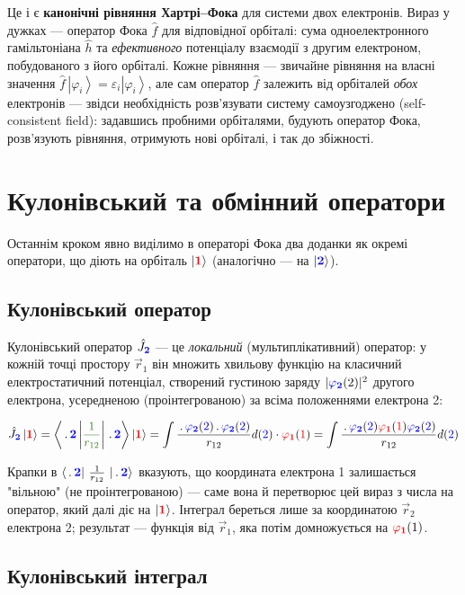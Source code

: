 \documentclass[]{article}
\def\ket#1{\left| #1 \right\rangle }
\def\bra#1{\left\langle #1 \right| }
\def\opbracket#1#2#3{\left\langle #1\left| \textcolor{OliveGreen}{#2}\right|  #3 \right\rangle}
\def\vr{\vec{r}}
\let\vphi\varphi
\let\ve\varepsilon
\def\f{(\textcolor{red}{1})}
\def\s{(\textcolor{blue}{2})}
\def\F{\textcolor{red}{\mathbf{1}}}
\def\S{\textcolor{blue}{\mathbf{2}}}
\def\oa{\textcolor{red}{ \vphi_{\mathbf{1}}} }
\def\ob{\textcolor{blue}{ \vphi_{\mathbf{2}}} }
\def\h{\hat{h}}
\def\V{\frac{1}{r_{12}}}
\def\dt{\,.\,}
\begin{document}
Це і є \textbf{канонічні рівняння Хартрі--Фока} для системи двох електронів. Вираз у дужках --- оператор Фока $\hat f$ для відповідної орбіталі: сума одноелектронного гамільтоніана $\h$ та \emph{ефективного} потенціалу взаємодії з другим електроном, побудованого з його орбіталі. Кожне рівняння --- звичайне рівняння на власні значення $\hat f\,\ket{\vphi_i}=\ve_i\ket{\vphi_i}$, але сам оператор $\hat f$ залежить від орбіталей \emph{обох} електронів --- звідси необхідність розв'язувати систему самоузгоджено (self-consistent field): задавшись пробними орбіталями, будують оператор Фока, розв'язують рівняння, отримують нові орбіталі, і так до збіжності.

\section{Кулонівський та обмінний оператори}

Останнім кроком явно виділимо в операторі Фока два доданки як окремі оператори, що діють на орбіталь $\ket{\F}$ (аналогічно --- на $\ket{\S}$).

\subsection*{Кулонівський оператор}

Кулонівський оператор $\hat{J}_{\S}$ --- це \emph{локальний} (мультиплікативний) оператор: у кожній точці простору $\vr_1$ він множить хвильову функцію на класичний електростатичний потенціал, створений густиною заряду $|\ob(2)|^2$ другого електрона, усередненою (проінтегрованою) за всіма положеннями електрона 2:

\begin{equation*}
   \hat{J}_{\S}\ket{\F} = \opbracket{\dt\S}{\V}{\dt\S} \ket{\F} = \int \frac{\dt\ob\s\dt\ob\s}{r_{12}} d\s \cdot \oa\f =  \int \frac{\dt\ob\s\oa\f\ob\s}{r_{12}} d\s
\end{equation*}

Крапки в $\bra{\dt\S}\,\V\,\ket{\dt\S}$ вказують, що координата електрона 1 залишається "вільною" (не проінтегрованою) --- саме вона й перетворює цей вираз з числа на оператор, який далі діє на $\ket{\F}$. Інтеграл береться лише за координатою $\vr_2$ електрона 2; результат --- функція від $\vr_1$, яка потім домножується на $\oa(1)$.

\subsection*{Кулонівський інтеграл}
\end{document}
